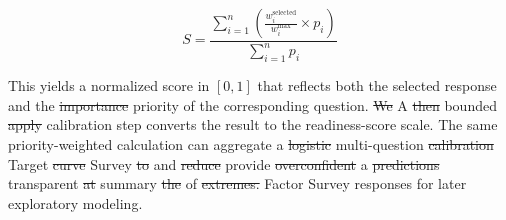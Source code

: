 \documentclass[letterpaper,11pt]{article}
\newcommand{\DIFdel}[1]{%
  \begingroup\setlength{\fboxsep}{0.5pt}%
  \colorbox{diffdelbg}{\textcolor{diffdeltext}{\sout{#1}}}%
  \endgroup}
\newcommand{\DIFadd}[1]{%
  \begingroup\setlength{\fboxsep}{0.5pt}%
  \colorbox{diffaddbg}{\textcolor{diffaddtext}{#1}}%
  \endgroup}
\begin{document}
\begin{equation}
S = \frac{\sum_{i=1}^{n} \left(\frac{w_i^{\text{selected}}}{w_i^{\text{max}}} \times p_i\right)}{\sum_{i=1}^{n} p_i}
\label{eq:priority}
\end{equation}

This yields a normalized score in $[0, 1]$ that reflects both the selected response and the \DIFdel{importance} \DIFadd{priority} of the corresponding question. \DIFdel{We} \DIFadd{A} \DIFdel{then} \DIFadd{bounded} \DIFdel{apply} \DIFadd{calibration} \DIFadd{step} \DIFadd{converts} \DIFadd{the} \DIFadd{result} \DIFadd{to} \DIFadd{the} \DIFadd{readiness-score} \DIFadd{scale.} \DIFadd{The} \DIFadd{same} \DIFadd{priority-weighted} \DIFadd{calculation} \DIFadd{can} \DIFadd{aggregate} a \DIFdel{logistic} \DIFadd{multi-question} \DIFdel{calibration} \DIFadd{Target} \DIFdel{curve} \DIFadd{Survey} \DIFdel{to} \DIFadd{and} \DIFdel{reduce} \DIFadd{provide} \DIFdel{overconfident} \DIFadd{a} \DIFdel{predictions} \DIFadd{transparent} \DIFdel{at} \DIFadd{summary} \DIFdel{the} \DIFadd{of} \DIFdel{extremes.} \DIFadd{Factor} \DIFadd{Survey} \DIFadd{responses} \DIFadd{for} \DIFadd{later} \DIFadd{exploratory} \DIFadd{modeling.}
\end{document}
